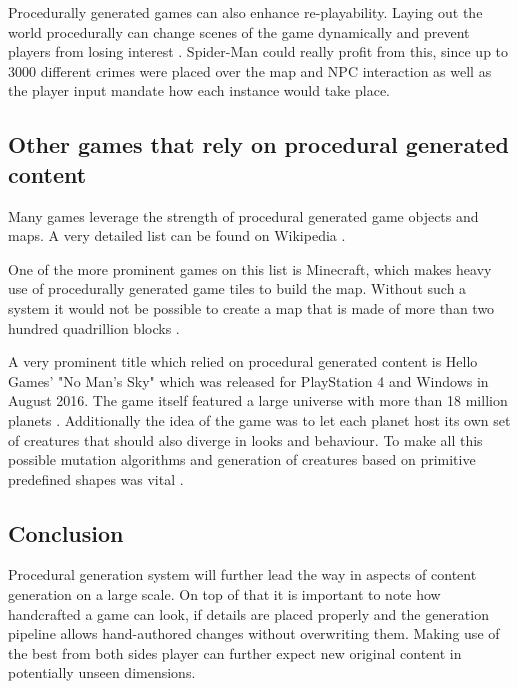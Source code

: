 \documentclass[a4paper]{article}
\begin{document}
Procedurally generated games can also enhance re-playability. Laying out the world procedurally can change scenes of the game dynamically and prevent players from losing interest \cite{green_2016}. Spider-Man could really profit from this, since up to  3000 different crimes were placed over the map and NPC interaction as well as the player input mandate how each instance would take place. 


\subsection{Other games that rely on procedural generated content}

Many games leverage the strength of procedural generated game objects and maps. A very detailed list can be found on Wikipedia \cite{wiki_list}. 

One of the more prominent games on this list is Minecraft, which makes heavy use of procedurally generated game tiles to build the map. Without such a system it would not be possible to create a map that is made of more than two hundred quadrillion blocks \cite{minecraft}.

A very prominent title which relied on procedural generated content is Hello Games' "No Man's Sky" which was released for PlayStation 4 and Windows in August 2016. The game itself featured a large universe with more than 18 million planets \cite{nomanssky}. Additionally the idea of the game was to let each planet host its own set of creatures that should also diverge in looks and behaviour. To make all this possible mutation algorithms and generation of creatures based on primitive predefined shapes was vital \cite{nomanssky}.

\subsection{Conclusion}

Procedural generation system will further lead the way in aspects of content generation on a large scale. On top of that it is important to note how handcrafted a game can look, if details are placed properly and the generation pipeline allows hand-authored changes without overwriting them. Making use of the best from both sides player can further expect new original content in potentially unseen dimensions.  

\newpage
\renewcommand{\refname}{\section{References and Further Sources}}
\end{document}
